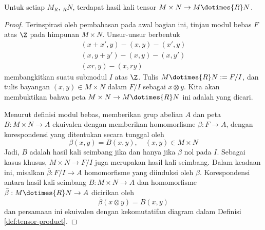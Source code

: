 \begin{lemma}
	Untuk setiap $M_R$, ${}_R N$, terdapat hasil kali tensor $M \times N \to M \dotimes{R} N$.
\end{lemma}
\begin{proof}
	Terinspirasi oleh pembahasan pada awal bagian ini, tinjau modul bebas $F$ atas $\Z$ pada himpunan $M \times N$. Unsur-unsur berbentuk
	\begin{gather*}
		(x + x', y) - (x, y) - (x', y) \\
		(x, y + y') - (x, y) - (x, y') \\
		(xr, y) - (x, ry)
	\end{gather*}
	membangkitkan suatu submodul $I$ atas $\Z$. Tulis $M \dotimes{R} N := F/I$, dan tulis bayangan $(x,y) \in M \times N$ dalam $F/I$ sebagai $x \otimes y$. Kita akan membuktikan bahwa peta $M \times N \to M \dotimes{R} N$ ini adalah yang dicari.

	Menurut definisi modul bebas, memberikan grup abelian $A$ dan peta $B: M \times N \to A$ ekuivalen dengan memberikan homomorfisme $\beta: F \to A$, dengan korespondensi yang ditentukan secara tunggal oleh
	\[ \beta(x,y) = B(x,y), \quad (x,y) \in M \times N \]
	Jadi, $B$ adalah hasil kali seimbang jika dan hanya jika $\beta$ nol pada $I$. Sebagai kasus khusus, $M \times N \to F/I$ juga merupakan hasil kali seimbang. Dalam keadaan ini, misalkan $\bar{\beta}: F/I \to A$ homomorfisme yang diinduksi oleh $\beta$. Korespondensi antara hasil kali seimbang $B: M \times N \to A$ dan homomorfisme $\bar{\beta}: M \dotimes{R} N \to A$ dicirikan oleh
	\[ \bar{\beta}(x \otimes y) = B(x,y) \]
	dan persamaan ini ekuivalen dengan kekomutatifan diagram dalam Definisi \ref{def:tensor-product}.
\end{proof}

